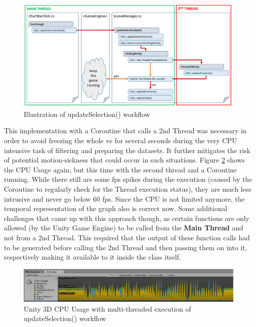\begin{figure}[t]
	\begin{center}
		\includegraphics[width=15cm]{03_Figures/08_Development/UpdateSelection.png}
		\caption{Illustration of updateSelection() workflow}
		\label{fig:unityupdateselection}
	\end{center}
\end{figure}
This implementation with a Coroutine that calls a 2nd Thread was necessary in order to avoid freezing the whole \gls{ve} for several seconds during the very CPU intensive task of filtering and preparing the datasets. It further mitigates the risk of potential motion-sickness that could occur in such situations. Figure \ref{fig:unityprofilemulti} shows the CPU Usage again, but this time with the second thread and a Coroutine running. While there still are some \gls{fps} spikes during the execution (caused by the Coroutine to regularly check for the Thread execution status), they are much less intrusive and never go below 60 \gls{fps}. Since the CPU is not limited anymore, the temporal representation of the graph also is correct now. \newline
Some additional challenges that came up with this approach though, as certain functions are only allowed (by the Unity Game Engine) to be called from the \textbf{Main Thread} and not from a 2nd Thread. This required that the output of these function calls had to be generated before calling the 2nd Thread and then passing them on into it, respectively making it available to it inside the class itself.
\begin{figure}[h]
	\begin{center}
		\includegraphics[width=15cm]{03_Figures/08_Development/CPU_Usage_Multithreaded.png}
		\caption{Unity 3D CPU Usage with multi-threaded execution of updateSelection() workflow}
		\label{fig:unityprofilemulti}
	\end{center}
\end{figure}


